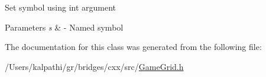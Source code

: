 Set symbol using int argument 
\begin{DoxyParams}{Parameters}
{\em s} & -\/ Named symbol \\
\hline
\end{DoxyParams}


The documentation for this class was generated from the following file\+:\begin{DoxyCompactItemize}
\item 
/\+Users/kalpathi/gr/bridges/cxx/src/\mbox{\hyperlink{_game_grid_8h}{Game\+Grid.\+h}}\end{DoxyCompactItemize}
